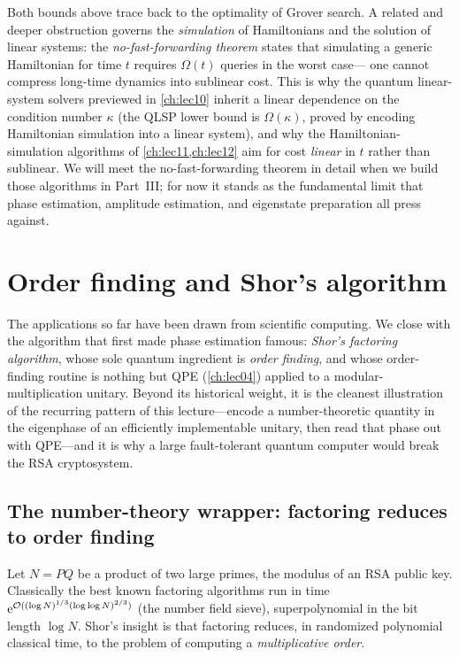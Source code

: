 Both bounds above trace back to the optimality of Grover search. A related and
deeper obstruction governs the \emph{simulation} of Hamiltonians and the solution
of linear systems: the \emph{no-fast-forwarding theorem} states that simulating a
generic Hamiltonian for time $t$ requires $\Omega(t)$ queries in the worst case---
one cannot compress long-time dynamics into sublinear cost. This is why the
quantum linear-system solvers previewed in \cref{ch:lec10} inherit a linear
dependence on the condition number $\kappa$ (the QLSP lower bound is
$\Omega(\kappa)$, proved by encoding Hamiltonian simulation into a linear system),
and why the Hamiltonian-simulation algorithms of \cref{ch:lec11,ch:lec12} aim for
cost \emph{linear} in $t$ rather than sublinear. We will meet the no-fast-forwarding
theorem in detail when we build those algorithms in Part~III; for now it stands as
the fundamental limit that phase estimation, amplitude estimation, and eigenstate
preparation all press against.

\section{Order finding and Shor's algorithm}
\label{sec:lec05-5}

The applications so far have been drawn from scientific computing. We close with
the algorithm that first made phase estimation famous: \emph{Shor's factoring
algorithm}, whose sole quantum ingredient is \emph{order finding}, and whose
order-finding routine is nothing but QPE (\cref{ch:lec04}) applied to a
modular-multiplication unitary. Beyond its historical weight, it is the cleanest
illustration of the recurring pattern of this lecture---encode a number-theoretic
quantity in the eigenphase of an efficiently implementable unitary, then read that
phase out with QPE---and it is why a large fault-tolerant quantum computer would
break the RSA cryptosystem.

\subsection*{The number-theory wrapper: factoring reduces to order finding}

Let $N=PQ$ be a product of two large primes, the modulus of an RSA public key.
Classically the best known factoring algorithms run in time
$\mathrm{e}^{\mathcal{O}((\log N)^{1/3}(\log\log N)^{2/3})}$ (the number field sieve),
superpolynomial in the bit length $\log N$. Shor's insight is that factoring
reduces, in randomized polynomial classical time, to the problem of computing a
\emph{multiplicative order}.

